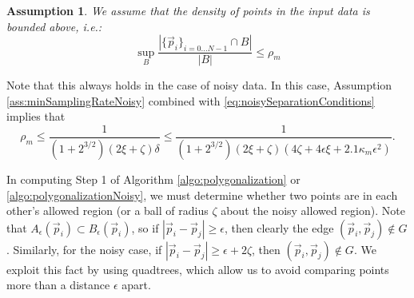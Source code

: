 \documentclass{article}
\newtheorem{assumption}{Assumption}
\newcommand{\nin}{\not\in}
\numberwithin{cntr}{section}
\numberwithin{equation}{section}
\newcommand{\abs}[1]{\left| #1 \right|}%
\newcommand{\vp}[0]{{\vec{p}}}
\newcommand{\OtoN}{{0 \ldots N-1}}
\newcommand{\pointData}{{ \{ \vp_{i} \}_{i=\OtoN} }}
\newcommand{\allowed}[2]{ { A_{#1}(#2) } }
\newcommand{\curvemax}{{\kappa_{m}}}
\newcommand{\curvesep}{{\delta}}
\newcommand{\pointNoise}{{\zeta}}
\newcommand{\tanNoise}{{\xi}}
\newcommand{\densitymax}{{\rho_{m}}}
\begin{document}
\begin{assumption}
  \label{ass:sampleDensity}
  We assume that the density of points in the input data is bounded above, i.e.:
  \begin{equation}
    \sup_{B} \frac{
      \abs{ \pointData \cap B }
    }{
      \abs{B}
    } \leq \densitymax
  \end{equation}
\end{assumption}

Note that this always holds in the case of noisy data. In this case, Assumption \ref{ass:minSamplingRateNoisy} combined with \eqref{eq:noisySeparationConditions} implies that
\begin{equation*}
  \densitymax \leq \frac{1}{ (1+2^{3/2})(2 \tanNoise + \pointNoise) \curvesep} \leq
  \frac{1}{ (1+2^{3/2})(2 \tanNoise + \pointNoise) (4 \pointNoise + 4 \epsilon \tanNoise + 2.1 \curvemax \epsilon^{2})}.
\end{equation*}

In computing Step 1 of Algorithm \ref{algo:polygonalization} or \ref{algo:polygonalizationNoisy}, we must determine whether two points are in each other's allowed region (or a ball of radius $\pointNoise$ about the noisy allowed region). Note that $\allowed{\epsilon}{\vp_{i}} \subset B_{\epsilon}(\vp_{i})$, so if $\abs{\vp_{i} - \vp_{j}} \geq \epsilon$, then clearly the edge $(\vp_{i},\vp_{j}) \nin G$. Similarly, for the noisy case, if $\abs{\vp_{i} - \vp_{j}} \geq \epsilon+2\pointNoise$, then $(\vp_{i},\vp_{j}) \nin G$. We exploit this fact by using quadtrees, which allow us to avoid comparing points more than a distance $\epsilon$ apart.

\vspace{.2in}
\end{document}

